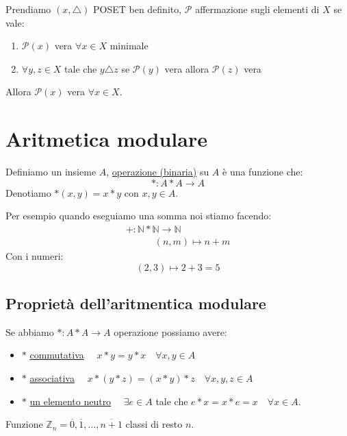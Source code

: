 \documentclass{article}
\theoremstyle{definition}
\begin{document}
Prendiamo $(x,\triangle)$ POSET ben definito, $\mathcal{P}$ affermazione sugli elementi di $X$ se vale:
\begin{enumerate}
        \item $\mathcal{P}(x)$ vera $\forall x \in X$ minimale
        \item $\forall y,z \in X $ tale che $y \triangle z$ se $\mathcal{P}(y)$ vera allora $\mathcal{P}(z)$ vera 
\end{enumerate}
Allora $\mathcal{P}(x)$ vera $\forall x \in X$.




\newpage
\section{Aritmetica modulare}

Definiamo un insieme $ A $, \underline{operazione (binaria)} su $ A $ è una funzione che:
\begin{equation*}
        * : A * A \to A
\end{equation*}
Denotiamo $*(x,y) = x*y$ con $ x,y \in A $. \par
Per esempio quando eseguiamo una somma noi stiamo facendo:
\begin{align*}
        + : \mathbb{N}*\mathbb{N} \to \mathbb{N} \\
        \quad \quad \quad (n,m) \mapsto n + m
\end{align*}
Con i numeri:
\begin{equation*}
        (2,3) \mapsto 2 + 3 = 5
\end{equation*}



\subsection{Proprietà dell'aritmentica modulare}
Se abbiamo $ * : A*A \to A $ operazione possiamo avere:
\begin{itemize}
        \item $ * $  \underline{commutativa} $ \quad x * y = y * x \quad \forall x,y \in A $
        \item $ * $  \underline{associativa} $ \quad x * (y * z) = (x * y) * z \quad \forall x,y,z \in A$
        \item $ * $ \underline{un elemento neutro} $ \quad \exists e \in A $ tale che $ e * x= x * e = x  \quad  \forall x \in A$. 
\end{itemize}
Funzione $ \mathbb{Z}_n = {\overline{0}, \overline{1},\ldots, \overline{n + 1}} $ classi di resto $ n $. 
\end{document}
